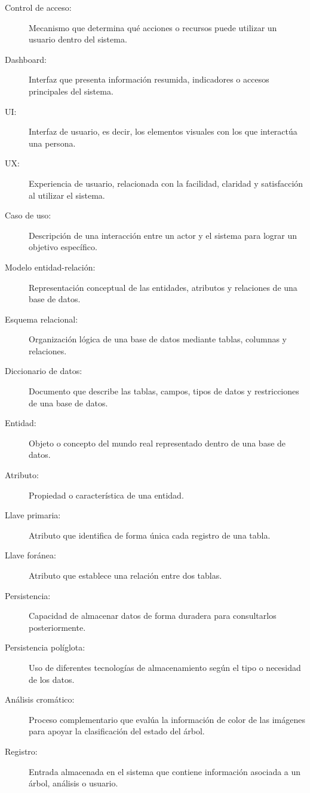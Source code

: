 \begin{description}
    \item[Control de acceso:] Mecanismo que determina qué acciones o recursos puede utilizar un usuario dentro del sistema.
    \item[Dashboard:] Interfaz que presenta información resumida, indicadores o accesos principales del sistema.
    \item[UI:] Interfaz de usuario, es decir, los elementos visuales con los que interactúa una persona.
    \item[UX:] Experiencia de usuario, relacionada con la facilidad, claridad y satisfacción al utilizar el sistema.
    \item[Caso de uso:] Descripción de una interacción entre un actor y el sistema para lograr un objetivo específico.
    \item[Modelo entidad-relación:] Representación conceptual de las entidades, atributos y relaciones de una base de datos.
    \item[Esquema relacional:] Organización lógica de una base de datos mediante tablas, columnas y relaciones.
    \item[Diccionario de datos:] Documento que describe las tablas, campos, tipos de datos y restricciones de una base de datos.
    \item[Entidad:] Objeto o concepto del mundo real representado dentro de una base de datos.
    \item[Atributo:] Propiedad o característica de una entidad.
    \item[Llave primaria:] Atributo que identifica de forma única cada registro de una tabla.
    \item[Llave foránea:] Atributo que establece una relación entre dos tablas.
    \item[Persistencia:] Capacidad de almacenar datos de forma duradera para consultarlos posteriormente.
    \item[Persistencia políglota:] Uso de diferentes tecnologías de almacenamiento según el tipo o necesidad de los datos.
    \item[Análisis cromático:] Proceso complementario que evalúa la información de color de las imágenes para apoyar la clasificación del estado del árbol.
    \item[Registro:] Entrada almacenada en el sistema que contiene información asociada a un árbol, análisis o usuario.
\end{description}
